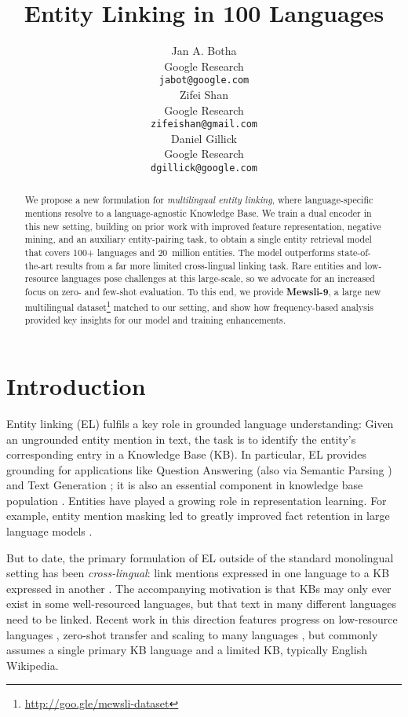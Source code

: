 \documentclass[11pt,a4paper]{article}
\title{Entity Linking in 100 Languages}
\author{Jan A. Botha \\ Google Research \\
  \texttt{jabot@google.com} \\\And
  Zifei Shan \\ Google Research \\
  \texttt{zifeishan@gmail.com} \\\And
  Daniel Gillick \\ Google Research \\
  \texttt{dgillick@google.com}}
\date{}
\begin{document}
\maketitle
\begin{abstract}
We propose a new formulation for \emph{multilingual entity linking}, where language-specific mentions resolve to a language-agnostic Knowledge Base.
We train a dual encoder in this new setting, building on prior work with improved feature representation, negative mining, and an auxiliary entity-pairing task, to obtain a single entity retrieval model that covers 100+ languages and 20~million entities.
The model outperforms state-of-the-art results from a far more limited cross-lingual linking task.
Rare entities and low-resource languages pose challenges at this large-scale, so we advocate for an increased focus on zero- and few-shot evaluation.
To this end, we provide \textbf{Mewsli-9}, a large new multilingual dataset\footnote{\url{http://goo.gle/mewsli-dataset}} matched to our setting, and show how frequency-based analysis provided key insights for our model and training enhancements.
\end{abstract}

\section{Introduction}
Entity linking (EL) fulfils a key role in grounded language understanding:
Given an ungrounded entity mention in text, the task is to identify the entity’s corresponding entry in a Knowledge Base (KB).
In particular, EL provides grounding for applications like Question Answering \citep{fevry2020entities} (also via Semantic Parsing \citep{shaw2019generating}) and Text Generation \citep{puduppully2019data}; it is also an essential component in knowledge base population \citep{shen2014entity}. Entities have played a growing role in representation learning. For example, entity mention masking led to greatly improved fact retention in large language models \citep{guu2020realm,roberts2020much}.

But to date, the primary formulation of EL outside of the standard monolingual setting has been \emph{cross-lingual}: link mentions expressed in one language to a KB expressed in another \citep{mcnamee-etal-2011-cross,tsai-roth-2016-cross,sil2018neural}. The accompanying motivation is that KBs may only ever exist in some well-resourced languages, but that text in many different languages need to be linked. 
Recent work in this direction features progress on low-resource languages \cite{zhou_tacl2020},
zero-shot transfer \cite{sil-florian-2016-one,rijhwani2019zero,zhou2019towards}
and scaling to many languages \cite{pan-etal-2017-cross}, but commonly assumes
a single primary KB language and a limited KB, typically English Wikipedia.
\end{document}
